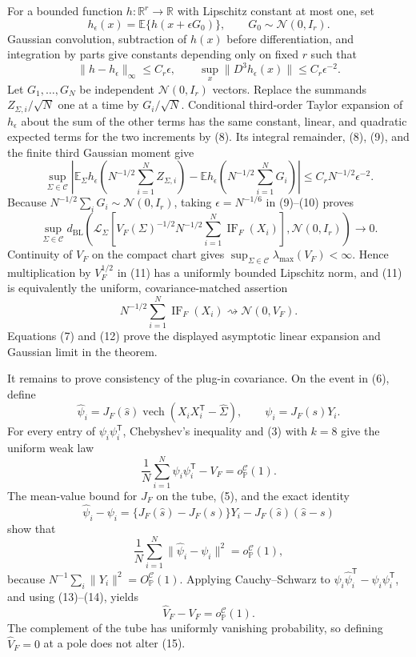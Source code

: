 For a bounded function \(h:\mathbb R^r\to\mathbb R\) with Lipschitz constant at most one, set
\[
 h_{\epsilon}(x)=\mathbb E\{h(x+\epsilon G_0)\},
 \qquad G_0\sim\mathcal N(0,I_r).
\]
Gaussian convolution, subtraction of \(h(x)\) before differentiation, and integration by parts give constants depending only on fixed \(r\) such that
\[
 \lVert h-h_{\epsilon}\rVert_{\infty}\le C_r\epsilon,
 \qquad
 \sup_x\lVert D^3h_{\epsilon}(x)\rVert\le C_r\epsilon^{-2}.
\tag{9}
\]
Let \(G_1,\ldots,G_N\) be independent \(\mathcal N(0,I_r)\) vectors.  Replace the summands \(Z_{\Sigma,i}/\sqrt N\) one at a time by \(G_i/\sqrt N\).  Conditional third-order Taylor expansion of \(h_{\epsilon}\) about the sum of the other terms has the same constant, linear, and quadratic expected terms for the two increments by (8).  Its integral remainder, (8), (9), and the finite third Gaussian moment give
\[
 \sup_{\Sigma\in\mathcal C}
 \left|
 \mathbb E_{\Sigma}h_{\epsilon}\!\left(N^{-1/2}\sum_{i=1}^N Z_{\Sigma,i}\right)
 -\mathbb Eh_{\epsilon}\!\left(N^{-1/2}\sum_{i=1}^N G_i\right)
 \right|
 \le C_rN^{-1/2}\epsilon^{-2}.
\tag{10}
\]
Because \(N^{-1/2}\sum_iG_i\sim\mathcal N(0,I_r)\), taking \(\epsilon=N^{-1/6}\) in (9)--(10) proves
\[
 \sup_{\Sigma\in\mathcal C}
 d_{\mathrm{BL}}\!\left(
  \mathcal L_{\Sigma}\!\left[V_F(\Sigma)^{-1/2}N^{-1/2}
    \sum_{i=1}^N\operatorname{IF}_F(X_i)\right],
  \mathcal N(0,I_r)
 \right)\longrightarrow0.
\tag{11}
\]
Continuity of \(V_F\) on the compact chart gives
\(\sup_{\Sigma\in\mathcal C}\lambda_{\max}(V_F)<\infty\).  Hence multiplication by \(V_F^{1/2}\) in (11) has a uniformly bounded Lipschitz norm, and (11) is equivalently the uniform, covariance-matched assertion
\[
 N^{-1/2}\sum_{i=1}^N\operatorname{IF}_F(X_i)
 \rightsquigarrow\mathcal N(0,V_F).
\tag{12}
\]
Equations (7) and (12) prove the displayed asymptotic linear expansion and Gaussian limit in the theorem.

It remains to prove consistency of the plug-in covariance.  On the event in (6), define
\[
 \widehat\psi_i
 =J_F(\widehat s)\operatorname{vech}(X_iX_i^{\mathsf T}-\widehat\Sigma),
 \qquad
 \psi_i=J_F(s)Y_i.
\]
For every entry of \(\psi_i\psi_i^{\mathsf T}\), Chebyshev's inequality and (3) with \(k=8\) give the uniform weak law
\[
 \frac1N\sum_{i=1}^N\psi_i\psi_i^{\mathsf T}-V_F
 =o_{\mathbb P}^{\mathcal C}(1).
\tag{13}
\]
The mean-value bound for \(J_F\) on the tube, (5), and the exact identity
\[
 \widehat\psi_i-\psi_i
 =\{J_F(\widehat s)-J_F(s)\}Y_i
  -J_F(\widehat s)(\widehat s-s)
\]
show that
\[
 \frac1N\sum_{i=1}^N\lVert\widehat\psi_i-\psi_i\rVert^2
 =o_{\mathbb P}^{\mathcal C}(1),
\tag{14}
\]
because \(N^{-1}\sum_i\lVert Y_i\rVert^2=O_{\mathbb P}^{\mathcal C}(1)\).  Applying Cauchy--Schwarz to
\(\widehat\psi_i\widehat\psi_i^{\mathsf T}-\psi_i\psi_i^{\mathsf T}\), and using (13)--(14), yields
\[
 \widehat V_F-V_F=o_{\mathbb P}^{\mathcal C}(1).
\tag{15}
\]
The complement of the tube has uniformly vanishing probability, so defining \(\widehat V_F=0\) at a pole does not alter (15).


